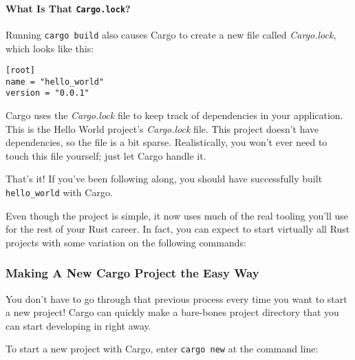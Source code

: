 \documentclass[a4paper,]{book}
\newenvironment{Shaded}{\begin{snugshade}}{\end{snugshade}}
\newcommand{\KeywordTok}[1]{\textcolor[rgb]{0.13,0.29,0.53}{\textbf{{#1}}}}
\newcommand{\NormalTok}[1]{{#1}}
\let\oldparagraph\paragraph
\renewcommand{\paragraph}[1]{\oldparagraph{#1}\mbox{}}
\begin{document}
\paragraph{\texorpdfstring{What Is That
\texttt{Cargo.lock}?}{What Is That Cargo.lock?}}\label{what-is-that-cargo.lock}

Running \texttt{cargo\ build} also causes Cargo to create a new file
called \emph{Cargo.lock}, which looks like this:

\begin{verbatim}
[root]
name = "hello_world"
version = "0.0.1"
\end{verbatim}

Cargo uses the \emph{Cargo.lock} file to keep track of dependencies in
your application. This is the Hello World project's \emph{Cargo.lock}
file. This project doesn't have dependencies, so the file is a bit
sparse. Realistically, you won't ever need to touch this file yourself;
just let Cargo handle it.

That's it! If you've been following along, you should have successfully
built \texttt{hello\_world} with Cargo.

Even though the project is simple, it now uses much of the real tooling
you'll use for the rest of your Rust career. In fact, you can expect to
start virtually all Rust projects with some variation on the following
commands:

\begin{Shaded}
\end{Shaded}

\subsubsection{Making A New Cargo Project the Easy
Way}\label{making-a-new-cargo-project-the-easy-way}

You don't have to go through that previous process every time you want
to start a new project! Cargo can quickly make a bare-bones project
directory that you can start developing in right away.

To start a new project with Cargo, enter \texttt{cargo\ new} at the
command line:

\begin{Shaded}
\end{Shaded}
\end{document}
